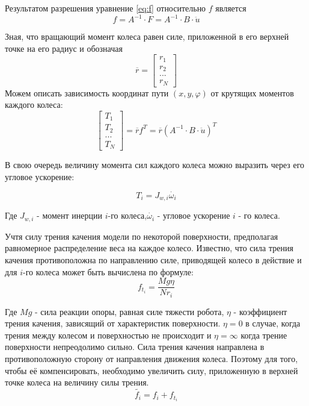 \documentclass[oneside,final,14pt]{extreport}
\begin{document}
Результатом разрешения уравнение \ref{eq:f} относительно $f$ является
\begin{equation}
f
=
A^{-1}
\cdot
F
=
A^{-1}
\cdot
B 
\cdot
\ddot{u}
\end{equation}

Зная, что вращающий момент колеса равен силе, приложенной в его верхней точке на его радиус и обозначая 
\begin{equation}
\overline{r} 
=
\begin{bmatrix}
r_{1} \\
r_{2} \\
... \\
r_{N}
\end{bmatrix}
\end{equation}
Можем описать зависимость координат пути $(x,y,\varphi)$ от крутящих моментов каждого колеса:
\begin{equation}
\label{eq:dynamic_w_friction}
\begin{bmatrix}
T_{1} \\
T_{2} \\
... \\
T_{N}
\end{bmatrix}
=
\overline{r}
f^{T}
=
\overline{r}
(
A^{-1}
\cdot
B 
\cdot
\ddot{u}
)^{T}
\end{equation}

В свою очередь величину момента сил каждого колеса можно выразить через его угловое ускорение:

\begin{equation}
T_{i}
=
J_{w,i}\dot{\omega_{i}}
\end{equation}

Где $J_{w,i}$ - момент инерции $i$-го колеса,$\dot{\omega_{i}}$ - угловое ускорение $i$ - го колеса.

Учтя силу трения качения модели по некоторой поверхности, предполагая равномерное распределение веса на каждое колесо. Известно, что сила трения качения противоположна по направлению силе, приводящей колесо в действие и для $i$-го колеса может быть вычислена по формуле:
\begin{equation}
f_{t_{i}}
=
\frac{Mg\eta}{Nr_{i}}
\end{equation}

Где $Mg$ - сила реакции опоры, равная силе тяжести робота, $\eta$ - коэффициент трения качения, зависящий от характеристик поверхности. $\eta = 0$ в случае, когда трения между колесом и поверхностью не происходит и $\eta = \infty$ когда трение поверхности непреодолимо сильно.  
Сила трения качения направлена в противоположную сторону от направления движения колеса. Поэтому для того, чтобы её компенсировать, необходимо увеличить силу, приложенную в верхней точке колеса на величину силы трения.
\begin{equation}
\tilde{f_{i}}
=
f_{i}
+
f_{t_{i}}
\end{equation}
\end{document}
